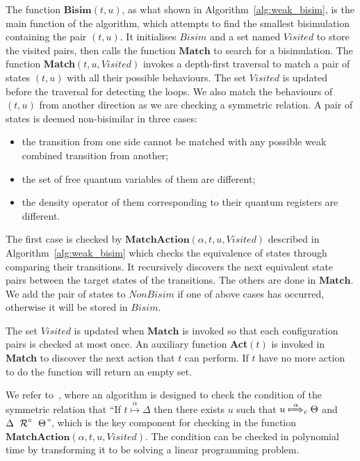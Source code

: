 \documentclass[a4paper,runningheads]{llncs}
\newcommand{\lift}[1]{\mathrel{{#1}^\circ}}
\begin{document}
The function $\textbf{Bisim}(t,u)$, as what shown in Algorithm~\ref{alg:weak_bisim}, is the main function of the algorithm, which attempts to find the smallest bisimulation containing the pair $(t,u)$. It initialises $Bisim$ and a set named $Visited$ to store the visited pairs, then calls the function $\textbf{Match}$ to search for a bisimulation. The function \textbf{Match}$(t,u,Visited)$ invokes a depth-first traversal to match a pair of states $(t,u)$ with all their possible behaviours. The set $Visited$ is updated before the traversal for detecting the loops. We also match the behaviours of $(t,u)$ from another direction as we are checking a symmetric relation. A pair of states is deemed non-bisimilar in three cases:
\begin{itemize}
    \item the transition from one side cannot be matched with any possible weak combined transition from another;
    \item the set of free quantum variables of them are different;
    \item the density operator of them corresponding to their quantum registers are different.
\end{itemize}
The first case is checked by $\textbf{MatchAction}(\alpha,t,u,Visited)$ described in Algorithm~\ref{alg:weak_bisim} which checks the equivalence of states through comparing their transitions. It recursively discovers the next equivalent state pairs between the target states of the transitions. The others are done in $\textbf{Match}$. We add the pair of states to $NonBisim$ if one of above cases has occurred, otherwise it will be stored in $Bisim$.

The set $Visited$ is updated when $\textbf{Match}$ is invoked so that each configuration pairs is checked at most once.
An auxiliary function \textbf{Act}$(t)$ is invoked in \textbf{Match} to discover the next action that $t$ can perform. If $t$ have no more action to do the function will return an empty set.

We refer to~\cite{TH15}, where an algorithm is designed to check the condition of the symmetric relation that ``If $t\overset{\alpha}{\longmapsto}\Delta$ then there exists $u$ such that $u\overset{\alpha}{\mapstochar\Longrightarrow}_{c}\Theta$ and $\Delta~\lift{\aRel}~\Theta$'', which is the key component for checking in the function $\textbf{MatchAction}(\alpha,t,u,Visited)$. The condition can be checked in polynomial time by transforming it to be solving a linear programming problem. 
\end{document}
